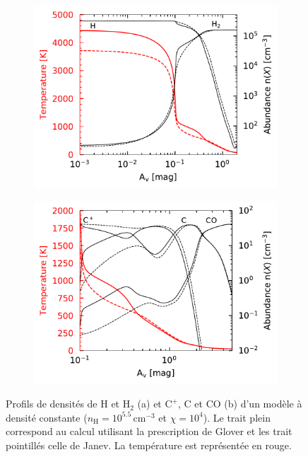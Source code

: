 \begin{figure}[!h]
    \centering
    \begin{subfigure}[t]{0.49\textwidth} %
        \centering \includegraphics[trim = {0 0 0 0 },clip,width=1\textwidth]{figure/H2/bosse_dcte_janevVSglover/profilT.pdf}
        \caption{}
        \label{fig:H2:bosse:plotH}
    \end{subfigure}
    \begin{subfigure}[t]{0.49\textwidth}
        \centering \includegraphics[trim = {0 0 0 0 },clip,width=1\textwidth]{figure/H2/bosse_dcte_janevVSglover/Cp_C_CO.pdf}
        \caption{}
    \label{fig:H2:bosse:plotC}
    \end{subfigure}
    \caption{Profils de densités de $\mathrm{H}$ et $\mathrm{H}_2$ (a) et $\mathrm{C}^+$, $\mathrm{C}$ et $\mathrm{CO}$ (b) d'un modèle à densité constante ($n_\mathrm{H} = 10^{5.5}\,\mathrm{cm}^{-3}$ et $\chi = 10^4$). Le trait plein correspond au calcul utilisant la prescription de Glover et les trait pointillés celle de Janev. La température est représentée en rouge.}
    
\end{figure}

